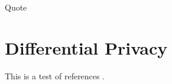 \documentclass[../../fulltext/fulltext.tex]{subfiles}
\begin{document}
\begin{savequote}[45mm]
	Quote
\end{savequote}


\chapter{Differential Privacy}

This is a test of references \cite{diffpriv-survey-of-results}.
\end{document}
